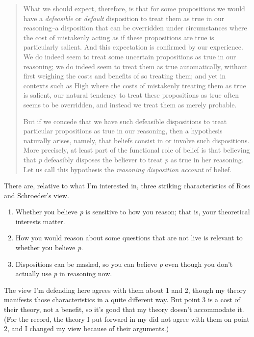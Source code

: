 \documentclass[11pt,]{book}
\providecommand{\tightlist}{%
  \setlength{\itemsep}{0pt}\setlength{\parskip}{0pt}}
\begin{document}
\begin{quote}
What we should expect, therefore, is that for some propositions we would have a \emph{defeasible} or \emph{default} disposition to treat them as true in our reasoning--a disposition that can be overridden under circumstances where the cost of mistakenly acting as if these propositions are true is particularly salient. And this expectation is confirmed by our experience. We do indeed seem to treat some uncertain propositions as true in our reasoning; we do indeed seem to treat them as true automatically, without first weighing the costs and benefits of so treating them; and yet in contexts such as High where the costs of mistakenly treating them as true is salient, our natural tendency to treat these propositions as true often seems to be overridden, and instead we treat them as merely probable.

But if we concede that we have such defeasible dispositions to treat particular propositions as true in our reasoning, then a hypothesis naturally arises, namely, that beliefs consist in or involve such dispositions. More precisely, at least part of the functional role of belief is that believing that \emph{p} defeasibly disposes the believer to treat \emph{p} as true in her reasoning. Let us call this hypothesis the \emph{reasoning disposition account} of belief. \citep[ 9-10]{SchroederRoss2012}
\end{quote}

There are, relative to what I'm interested in, three striking characteristics of Ross and Schroeder's view.

\begin{enumerate}
\def\labelenumi{\arabic{enumi}.}
\tightlist
\item
  Whether you believe \emph{p} is sensitive to how you reason; that is, your
  theoretical interests matter.
\item
  How you would reason about some questions that are not live is relevant
  to whether you believe \emph{p}.
\item
  Dispositions can be masked, so you can believe \emph{p} even though you don't
  actually use \emph{p} in reasoning now.
\end{enumerate}

The view I'm defending here agrees with them about 1 and 2, though my theory manifests those characteristics in a quite different way. But point 3 is a cost of their theory, not a benefit, so it's good that my theory doesn't accommodate it. (For the record, the theory I put forward in my \citeyearpar{Weatherson2005-WEACWD} did not agree with them on point 2, and I changed my view because of their arguments.)
\end{document}

